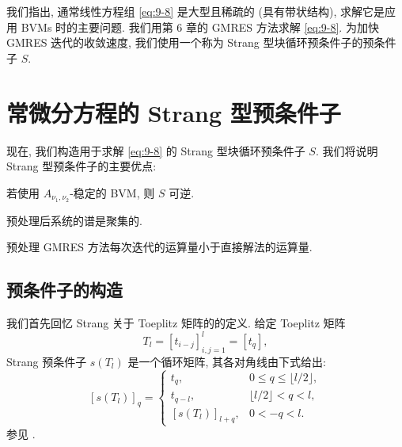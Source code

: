 我们指出, 通常线性方程组 \eqref{eq:9-8} 是大型且稀疏的 (具有带状结构), 求解它是应用 BVMs 时的主要问题. 我们用第 6 章的 GMRES 方法求解 \eqref{eq:9-8}. 为加快 GMRES 迭代的收敛速度, 我们使用一个称为 Strang 型块循环预条件子的预条件子 $S$.

\section{常微分方程的 Strang 型预条件子}
\label{sec:9-3}

现在, 我们构造用于求解 \eqref{eq:9-8} 的 Strang 型块循环预条件子 $S$. 我们将说明 Strang 型预条件子的主要优点:

\begin{parenlist}
  \item 若使用 $A_{\nu_1,\nu_2}$-稳定的 BVM, 则 $S$ 可逆.
  \item 预处理后系统的谱是聚集的.
  \item 预处理 GMRES 方法每次迭代的运算量小于直接解法的运算量.
\end{parenlist}

\subsection{预条件子的构造}
\label{sec:9-3-1}

我们首先回忆 Strang 关于 Toeplitz 矩阵的的定义. 给定 Toeplitz 矩阵
\[
  T_l=[t_{i-j}]_{i,j=1}^{l}=[t_q],
\]
Strang 预条件子 $s(T_l)$ 是一个循环矩阵, 其各对角线由下式给出:
\[
  [s(T_l)]_q=\begin{cases}
    t_q, & 0\leqslant q\leqslant\lfloor l/2\rfloor,\\
    t_{q-l}, & \lfloor l/2\rfloor<q<l,\\
    [s(T_l)]_{l+q}, & 0<-q<l.
  \end{cases}
\]
参见 \cite{src:16,src:18,src:42,src:43,src:77}.

